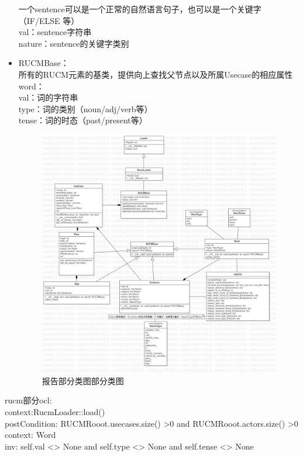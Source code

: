 \begin{itemize}
   		一个sentence可以是一个正常的自然语言句子，也可以是一个关键字（IF/ELSE 等）\\
   		val：sentence字符串\\
   		nature：sentence的关键字类别
   		\item 	RUCMBase：\\
   		所有的RUCM元素的基类，提供向上查找父节点以及所属Usecase的相应属性
   		word：\\
   		val：词的字符串\\
   		type：词的类别（noun/adj/verb等）\\
   		tense：词的时态（past/present等）
   		\begin{figure}
   			\centering
   			\includegraphics[width=1\textwidth]{src/classDiagram_rucmElement.jpg} 
   			\caption{报告部分类图部分类图} 
   		\end{figure}
   	\end{itemize}
   	rucm部分ocl:\\
   	context:RucmLoader::load()\\
   	postCondition: RUCMRooot.usecases.size() >0 and RUCMRooot.actors.size() >0\\ 
   	context: Word\\
   	inv: self.val <> None and self.type <> None and self.tense <> None\\
